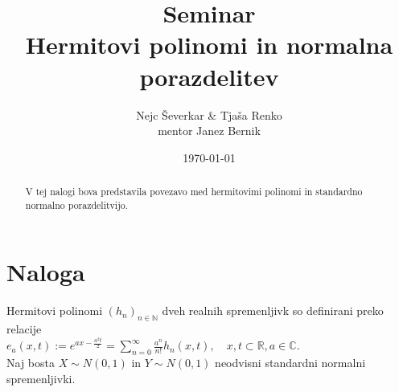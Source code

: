 \documentclass[ letterpaper, titlepage, fleqn]{article}
\begin{document}
\title{Seminar \\ Hermitovi polinomi in normalna porazdelitev}
\author{Nejc Ševerkar \& Tjaša Renko \\ mentor Janez Bernik}
\date{\today}
\maketitle

\begin{abstract}
\begin{center}
V tej nalogi bova predstavila povezavo med hermitovimi polinomi
in standardno normalno porazdelitvijo.
\end{center}
\end{abstract}

\section*{Naloga}
Hermitovi polinomi $(h_n)_{n \in \mathbb{N}}$ dveh realnih spremenljivk
so definirani preko relacije \\[10px]
$e_a(x, t) := e^{ax -\frac{a^2t}{2}} = \sum_{n=0}^{\infty} \frac{a^n}{n!} h_n(x, t), 
\quad {x, t} \subset \mathbb{R}, a \in \mathbb{C}$.\\[10px]
Naj bosta $X \sim N(0, 1)$ in $Y \sim N(0, 1)$ neodvisni standardni normalni spremenljivki.
\end{document}
